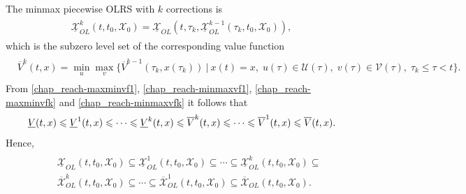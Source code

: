 \documentclass[letterpaper,10pt,english]{sphinxmanual}
\begin{document}
The minmax piecewise OLRS with $k$ corrections is
\label{chap_reach:equation-minmaxk}\begin{gather}
\begin{split}\underline{{\mathcal X}}_{OL}^k(t, t_0, {\mathcal X}_0) =
\underline{{\mathcal X}}_{OL}(t, \tau_k, \underline{{\mathcal X}}_{OL}^{k-1}(\tau_k, t_0, {\mathcal X}_0)),\end{split}\label{chap_reach-minmaxk}
\end{gather}
which is the subzero level set of the corresponding value function
\label{chap_reach:equation-minmaxvfk}\begin{gather}
\begin{split}\begin{aligned}
\overline{V}^k(t, x) = \min_u\max_v\{\overline{V}^{k-1}(\tau_k, x(\tau_k)) ~|~ x(t)=x, \;
u(\tau)\in{\mathcal U}(\tau), \; v(\tau)\in{\mathcal V}(\tau), \; \tau_k\leqslant\tau<t\}.
\end{aligned}\end{split}\label{chap_reach-minmaxvfk}
\end{gather}
From \eqref{chap_reach-maxminvf1}, \eqref{chap_reach-minmaxvf1}, \eqref{chap_reach-maxminvfk} and \eqref{chap_reach-minmaxvfk} it
follows that
\begin{gather}
\begin{split}\underline{V}(t, x) \leqslant\underline{V}^1(t, x)\leqslant\cdots
\leqslant\underline{V}^k(t, x) \leqslant\overline{V}^k(t, x) \leqslant\cdots
\leqslant\overline{V}^1(t, x) \leqslant\overline{V}(t, x) .\end{split}\notag
\end{gather}
Hence,
\label{chap_reach:equation-olrsinclusion}\begin{gather}
\begin{split}\begin{aligned}
&&\underline{{\mathcal X}}_{OL}(t, t_0, {\mathcal X}_0) \subseteq \underline{{\mathcal X}}_{OL}^1(t, t_0, {\mathcal X}_0) \subseteq \cdots
\subseteq \underline{{\mathcal X}}_{OL}^k(t, t_0, {\mathcal X}_0) \subseteq \nonumber \\
&&\overline{{\mathcal X}}_{OL}^k(t, t_0, {\mathcal X}_0) \subseteq \cdots \subseteq \overline{{\mathcal X}}_{OL}^1(t, t_0, {\mathcal X}_0)
\subseteq \overline{{\mathcal X}}_{OL}(t, t_0, {\mathcal X}_0) .
\end{aligned}\end{split}\label{chap_reach-olrsinclusion}
\end{gather}
\end{document}
